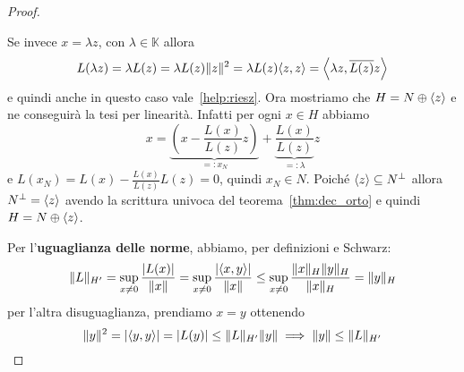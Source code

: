 \begin{proof}
\begin{enumerate}[label = \arabic*.]
        Se invece \(x = \lambda z\), con \(\lambda \in \mathbb{K}\) allora
        \[
          L{(\lambda z)} = \lambda L{(z)} = \lambda L{(z)} \|z\|^2 =
            \lambda{L{(z)}} {\left\langle z, z\right\rangle} =  
          {\left\langle\lambda z, \overline{L{(z)}}z\right\rangle} 
        \]
        e quindi anche in questo caso vale~\eqref{help:riesz}. Ora mostriamo che
        \(H = N \oplus {\left\langle z\right\rangle} \) e ne conseguirà la tesi per linearità.
        Infatti per ogni \(x \in H\) abbiamo
        \[
          x = \underbrace{\left( x - \frac{L{(x)}}{L{(z)}}z \right)}_{ =: x_N}  +
          \underbrace{\frac{L{(x)}}{L{(z)}}}_{=: \lambda}  z
        \]
        e \(L{(x_N)} = L{(x)} - \frac{L{(x)}}{L{(z)}} L{(z)} = 0\), quindi \(x_N
        \in N\). Poiché \({\left\langle z\right\rangle} \subseteq N^\perp  \) allora \(N^\perp  =
        {\left\langle z\right\rangle} \) avendo la scrittura univoca del teorema~\ref{thm:dec_orto} 
        e quindi \(H = N \oplus {\left\langle z\right\rangle} \). 
\end{enumerate}
    Per l'\textbf{uguaglianza delle norme}, abbiamo, per definizioni e Schwarz: 
    \[
        \|L\|_{H'}  = \sup_{x \neq 0} \frac{\left| L{(x)} \right| }{\|x\|} =
    \sup_{x \neq 0} \frac{\left| {\left\langle x, y\right\rangle}  \right|} {\|x\|} \le \sup_{x \neq
    0} \frac{\|x\|_H \|y\|_H}{\|x\|_H} = \|y\|_H
    \]
    per l'altra disuguaglianza, prendiamo \(x = y\) ottenendo
    \[
        \|y\|^2 = \left| {\left\langle y, y\right\rangle}  \right| = \left| L{(y)} \right| \le
        \|L\|_{H'} \|y\| \implies \|y\| \le \|L\|_{H'}
    \]
\end{proof}


